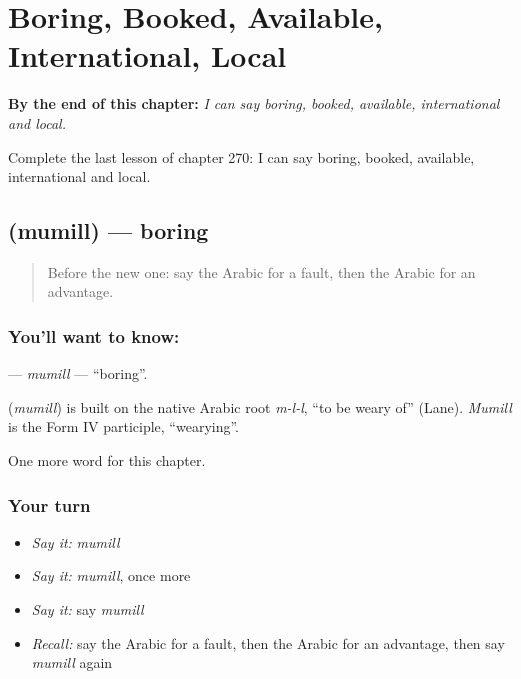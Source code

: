 
\chapter{Boring, Booked, Available, International, Local}
\label{ch:ar-boring-booked-available-international-local}

\begin{chapteropening}
\textbf{By the end of this chapter:} \emph{I can say boring, booked, available, international and local.}

Complete the last lesson of chapter 270: I can say boring, booked, available, international and local.
\end{chapteropening}

\section[\texorpdfstring{\ar{ممل} (mumill)}{ممل (mumill)}]{ (mumill) — boring}

\label{lesson:AR-C270-mumill}



\begin{quote}
Before the new one: say the Arabic for a fault, then the Arabic for an advantage.
\end{quote}

\subsection*{You'll want to know: }
\textbf{} — \emph{mumill} — \textquotedblleft{}boring\textquotedblright{}.

\begin{cousinweb}
\textbf{} (\emph{mumill}) is built on the native Arabic root \emph{m-l-l}, \textquotedblleft{}to be weary of\textquotedblright{} (Lane). \emph{Mumill} is the Form IV participle, \textquotedblleft{}wearying\textquotedblright{}.
\end{cousinweb}

\begin{grammarlens}[title={What you've built}]
One more word for this chapter.
\end{grammarlens}

\subsection*{Your turn}
\begin{itemize}
\raggedright
  \item \emph{Say it:} \emph{mumill}
  \item \emph{Say it:} \emph{mumill}, once more
  \item \emph{Say it:} say \emph{mumill}
  \item \emph{Recall:} say the Arabic for a fault, then the Arabic for an advantage, then say \emph{mumill} again
\end{itemize}

